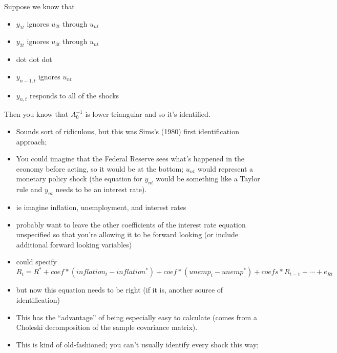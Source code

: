 Suppose we know that
\begin{itemize}
\item $y_{1t}$ ignores $u_{2t}$ through $u_{nt}$
\item $y_{2t}$ ignores $u_{3t}$ through $u_{nt}$
\item dot dot dot
\item $y_{n-1,t}$ ignores $u_{nt}$
\item $y_{n,t}$ responds to all of the shocks
\end{itemize}
Then you know that $A_0^{-1}$ is lower triangular and so it's
identified.

\begin{itemize}
\item Sounds sort of ridiculous, but this was Sims's (1980) first
  identification approach;
\item You could imagine that the Federal Reserve sees what's happened
  in the economy before acting, so it would be at the bottom; $u_{nt}$
  would represent a monetary policy shock (the equation for $y_{nt}$
  would be something like a Taylor rule and $y_{nt}$ needs to be an
  interest rate).
\item ie imagine inflation, unemployment, and interest rates
\item probably want to leave the other coefficients of the interest
  rate equation unspecified so that you're allowing it to be forward
  looking (or include additional forward looking variables)
\item could specify 
  \begin{equation*}
    R_t = R^* + coef * (inflation_t - inflation^*) + coef * (unemp_t - unemp^*) + coefs *
    R_{t-1} + ⋯ + e_{Rt}
  \end{equation*}
\item but now this equation needs to be right (if it is, another
  source of identification)
\item This has the ``advantage'' of being especially easy to calculate
  (comes from a Choleski decomposition of the sample covariance
  matrix).
\item This is kind of old-fashioned; you can't usually identify every
  shock this way;
\end{itemize}


